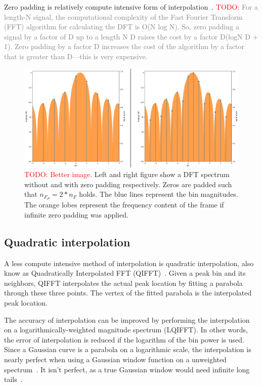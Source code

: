 \documentclass[10pt,twocolumn]{article}
\begin{document}
Zero padding is relatively compute intensive form of interpolation~\cite{interpolnozero}. %
\textcolor{red}{TODO: }\textcolor{gray}{For a length-N signal, the computational complexity of the Fast Fourier Transform (FFT) algorithm for calculating the DFT is O(N log N). So, zero padding a signal by a factor of D up to a length N D raises the cost by a factor D(logN D + 1). Zero padding by a factor D increases the cost of the algorithm by a factor that is greater than D—this is very expensive.}
\begin{figure}[h]
    \centering
    \includegraphics[width=\linewidth]{fig/zero_pad_interpolate.png}
    \caption{\textcolor{red}{TODO: Better image.} Left and right figure show a DFT spectrum without and with zero padding respectively. Zeros are padded such that $n_{F_P} = 2 * n_F$ holds. The blue lines represent the bin magnitudes. The orange lobes represent the frequency content of the frame if infinite zero padding was applied.}
    \label{fig:visualpadding}
\end{figure}


\subsection{Quadratic interpolation}
A less compute intensive method of interpolation is quadratic interpolation, also know as Quadratically Interpolated FFT (QIFFT)~\cite{interpolnozero}. Given a peak bin and its neighbors, QIFFT interpolates the actual peak location by fitting a parabola through these three points. The vertex of the fitted parabola is the interpolated peak location.

The accuracy of interpolation can be improved by performing the interpolation on a logarithmically-weighted magnitude spectrum (LQIFFT). In other words, the error of interpolation is reduced if the logarithm of the bin power is used. Since a Gaussian curve is a parabola on a logarithmic scale, the interpolation is nearly perfect when using a Gaussian window function on a unweighted spectrum~\cite{interpolgaus}. It isn't perfect, as a true Gaussian window would need infinite long tails~\cite{gauswin}.
\end{document}
